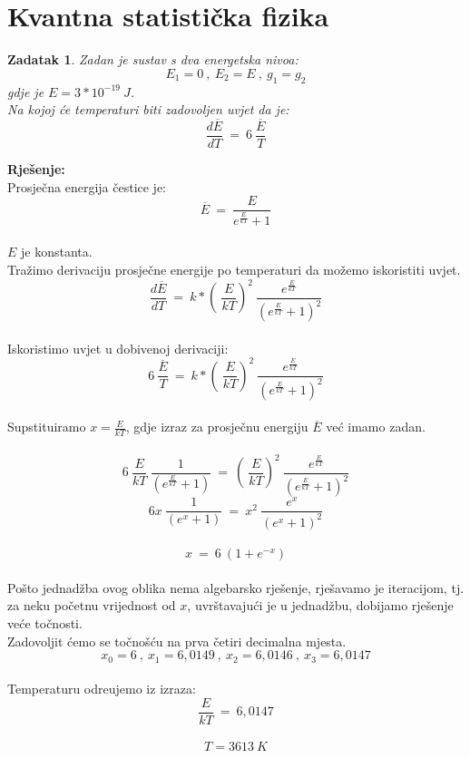 \documentclass[a4paper,12pt]{article}
\newtheorem{ZDK}{Zadatak}[section]
\begin{document}
\section{Kvantna statisti\v{c}ka fizika}
\begin{ZDK}
	Zadan je sustav s dva energetska nivoa: 
	$$ E_1=0\ ,\ E_2=E\ ,\ g_1=g_2 $$
	gdje je $E=3*10^{-19}\ J$. \\
	Na kojoj \'ce temperaturi biti zadovoljen uvjet da je:
	\\
	$$ \frac{d\overline{E}}{dT}\ =\ 6\ \frac{\overline{E}}{T} $$
\end{ZDK}
\textbf{Rje\v{s}enje:} \\
\newline
Prosje\v{c}na energija \v{c}estice je:
$$ \overline{E}\ =\ \frac{E}{e^{\frac{E}{kT}}+1} $$
\\
$E$ je konstanta. \\
Tra\v{z}imo derivaciju prosje\v{c}ne energije po temperaturi da mo\v{z}emo iskoristiti uvjet. \\
$$ \frac{d\overline{E}}{dT}\ =\ k*\left(\ \frac{E}{kT} \right)^2\ \frac{e^{\frac{E}{kT}}}{\left( e^{\frac{E}{kT}}+1 \right)^2} $$
\\
Iskoristimo uvjet u dobivenoj derivaciji:
$$ 6\ \frac{\overline{E}}{T}\ =\ k*\left(\ \frac{E}{kT} \right)^2\ \frac{e^{\frac{E}{kT}}}{\left( e^{\frac{E}{kT}}+1 \right)^2} $$
\\
Supstituiramo $x=\frac{E}{kT}$, gdje izraz za prosje\v{c}nu energiju $\overline{E}$ ve\'{c} imamo zadan.
\\
\\
$$ 6\ \frac{E}{kT}\ \frac{1}{\left( e^\frac{E}{kT}+1 \right)}\ =\ \left(\ \frac{E}{kT} \right)^2\ \frac{e^{\frac{E}{kT}}}{\left( e^{\frac{E}{kT}}+1 \right)^2} $$
\newpage
$$ 6x\ \frac{1}{(e^x+1)}\ =\ x^2\ \frac{e^x}{(e^x+1)^2}  $$
\\
$$ x\ =\ 6\ (1+e^{-x}) $$
\\
Po\v{s}to jednad\v{z}ba ovog oblika nema algebarsko rje\v{s}enje, rje\v{s}avamo je iteracijom, tj. za neku po\v{c}etnu vrijednost od $x$, uvr\v{s}tavaju\'ci je u 
jednad\v{z}bu, dobijamo rje\v{s}enje ve\'ce to\v{c}nosti. 
\\
Zadovoljit \'cemo se to\v{c}no\v{s}\'cu na prva \v{c}etiri decimalna mjesta.
\\
$$ x_0=6\ ,\ x_1=6,0149\ ,\ x_2=6,0146\ ,\ x_3=6,0147 $$
\\
Temperaturu odre\dj ujemo iz izraza:
$$ \frac{E}{kT}\ =\ 6,0147 $$
\\
$$ T=3613\ K $$
\end{document}
